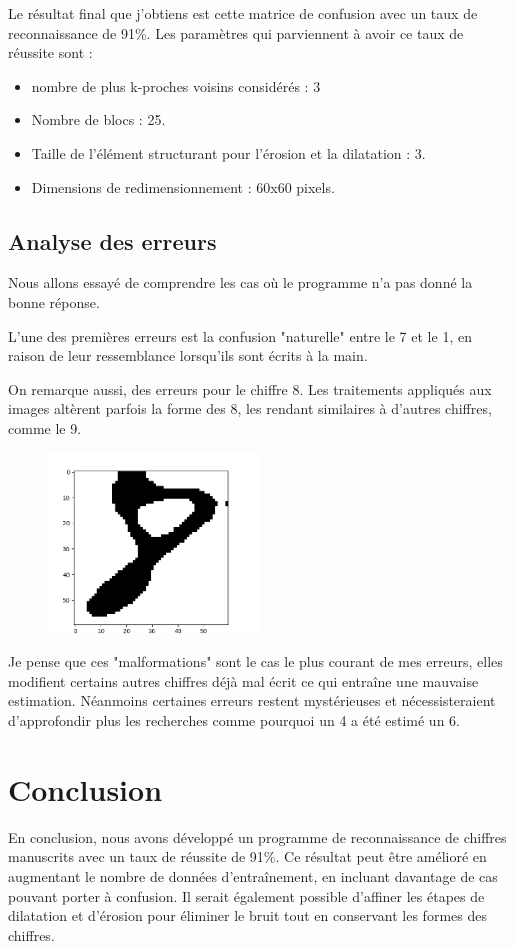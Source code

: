 \documentclass{article}
\begin{document}
Le résultat final que j'obtiens est cette matrice de confusion avec un taux de reconnaissance de 91\%. Les paramètres qui parviennent à avoir ce taux de réussite sont : 
\begin{itemize}
    \item nombre de plus k-proches voisins considérés : 3
    \item Nombre de blocs : 25.
    \item Taille de l'élément structurant pour l'érosion et la dilatation : 3.
    \item Dimensions de redimensionnement : 60x60 pixels.
\end{itemize}

\subsection{Analyse des erreurs}
Nous allons essayé de comprendre les cas où le programme n'a pas donné la bonne réponse. 

L'une des premières erreurs est la confusion "naturelle" entre le 7 et le 1, en raison de leur ressemblance lorsqu'ils sont écrits à la main.

On remarque aussi, des erreurs pour le chiffre 8. Les traitements appliqués aux images altèrent parfois la forme des 8, les rendant similaires à d'autres chiffres, comme le 9. 

\begin{figure}[h]
    \centering
    \includegraphics[width=0.5\textwidth]{images/8_similaire_9.png}
\end{figure}

Je pense que ces "malformations" sont le cas le plus courant de mes erreurs, elles modifient certains autres chiffres déjà mal écrit ce qui entraîne une mauvaise estimation. 
Néanmoins certaines erreurs restent mystérieuses et nécessisteraient d'approfondir plus les recherches comme pourquoi un 4 a été estimé un 6. 

\section{Conclusion}
En conclusion, nous avons développé un programme de reconnaissance de chiffres manuscrits avec un taux de réussite de 91\%. Ce résultat peut être amélioré en augmentant le nombre de données d'entraînement, en incluant davantage de cas pouvant porter à confusion. Il serait également possible d'affiner les étapes de dilatation et d'érosion pour éliminer le bruit tout en conservant les formes des chiffres.
\end{document}
